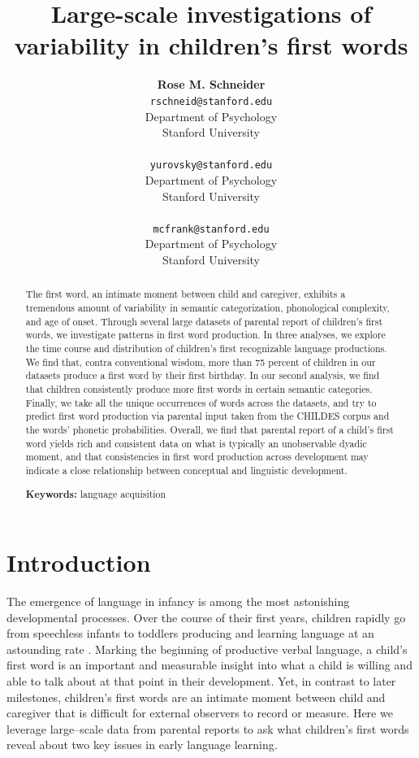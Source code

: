 \documentclass[10pt,letterpaper]{article}
\title{Large-scale investigations of variability in children's first words}
\author{{\large \bf Rose M. Schneider} \\ \texttt{rschneid@stanford.edu}\\ Department of Psychology \\ Stanford University \\ 
\And {\large \bf Daniel Yurovsky} \\ \texttt{yurovsky@stanford.edu} \\ Department of Psychology \\ Stanford University \\ 
\And {\large \bf Michael C. Frank} \\ \texttt{mcfrank@stanford.edu} \\ Department of Psychology \\ Stanford University \\ }
\begin{document}
\maketitle


\begin{abstract}
The first word, an intimate moment between child and caregiver, exhibits a tremendous amount of variability in semantic categorization, phonological complexity, and age of onset. Through several large datasets of parental report of children's first words, we investigate patterns in first word production. In three analyses, we explore the time course and distribution of children's first recognizable language productions. We find that, contra conventional wisdom, more than 75 percent of children in our datasets produce a first word by their first birthday. In our second analysis, we find that children consistently produce more first words in certain semantic categories. Finally, we take all the unique occurrences of words across the datasets, and try to predict first word production via parental input taken from the CHILDES corpus and the words' phonetic probabilities. Overall, we find that parental report of a child's first word yields rich and consistent data on what is typically an unobservable dyadic moment, and that consistencies in first word production across development may indicate a close relationship between conceptual and linguistic development.

\textbf{Keywords:}
language acquisition
\end{abstract}

\section{Introduction}

The emergence of language in infancy is among the most astonishing developmental processes. Over the course of their first years, children rapidly go from speechless infants to toddlers producing and learning language at an astounding rate \cite{fenson1994,bloom2002}. Marking the beginning of productive verbal language, a child's first word is an important and measurable insight into what a child is willing and able to talk about at that point in their development. Yet, in contrast to later milestones, children's first words are an intimate moment between child and caregiver that is difficult for external observers to record or measure. Here we leverage large--scale data from parental reports to ask what children's first words reveal about two key issues in early language learning. 
\end{document}
